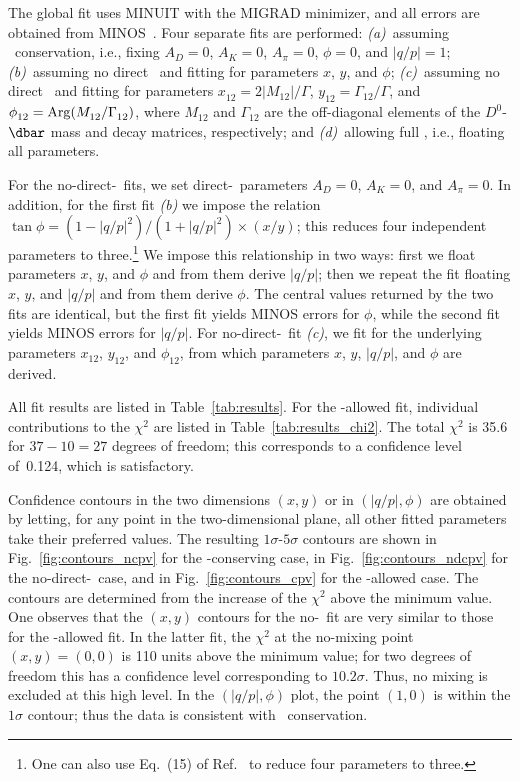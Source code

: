 The global fit uses MINUIT with the MIGRAD minimizer, 
and all errors are obtained from MINOS~\cite{MINUIT:webpage}. 
Four separate fits are performed: 
{\it (a)}\ assuming \cp\ conservation, i.e., fixing
$A^{}_D\!=\!0$, $A_K\!=\!0$, $A^{}_\pi\!=\!0$, $\phi\!=\!0$, 
and $|q/p|\!=\!1$;
{\it (b)}\ assuming no direct \cpv\ and fitting for
parameters $x$, $y$, and $\phi$; 
{\it (c)}\ assuming no direct \cpv\ and fitting for
parameters $x^{}_{12}= 2|M^{}_{12}|/\Gamma$, 
$y^{}_{12}= \Gamma^{}_{12}/\Gamma$, and 
$\phi^{}_{12}= {\rm Arg}(M^{}_{12}/\Gamma^{}_{12})$,
where $M^{}_{12}$ and $\Gamma^{}_{12}$ are the off-diagonal
elements of the $D^0$-$\dbar$ mass and decay matrices, respectively; and
{\it (d)}\ allowing full \cpv, i.e., floating all parameters. 

For the no-direct-\cpv\ fits, we set direct-\cpv\ parameters 
$A^{}_D\!=\!0$, $A_K\!=\!0$, and $A^{}_\pi\!=\!0$. In addition, for the 
first fit {\it (b)\/} we impose the relation~\cite{Ciuchini:2007cw,Kagan:2009gb}
$\tan\phi = (1-|q/p|^2)/(1+|q/p|^2)\times (x/y)$; this reduces 
four independent parameters to 
three.\footnote{One can also use Eq.~(15) of Ref.~\cite{Grossman:2009mn}
to reduce four parameters to three.} 
We impose this relationship in two ways:
first we float parameters $x$, $y$, and $\phi$ and from them derive $|q/p|$;
then we repeat the fit floating $x$, $y$, and $|q/p|$ and from them derive 
$\phi$. The central values returned by the two fits are identical, but the 
first fit yields MINOS errors for $\phi$, while the second fit 
yields MINOS errors for $|q/p|$. For no-direct-\cpv\ fit 
{\it (c)}, we fit for the underlying parameters $x^{}_{12}$, $y^{}_{12}$, 
and $\phi^{}_{12}$, from which parameters $x$, $y$, $|q/p|$, and $\phi$ 
are derived. 

All fit results are listed in 
Table~\ref{tab:results}. For the \cpv-allowed fit,
individual contributions to the $\chi^2$ are listed 
in Table~\ref{tab:results_chi2}. The total $\chi^2$ 
is 35.6 for $37-10=27$ degrees of freedom; this 
corresponds to a confidence level of~0.124, which 
is satisfactory.


Confidence contours in the two dimensions $(x,y)$ or 
in $(|q/p|,\phi)$ are obtained by letting, for any point in the
two-dimensional plane, all other fitted parameters take their 
preferred values. The resulting $1\sigma$-$5\sigma$ contours 
are shown 
in Fig.~\ref{fig:contours_ncpv} for the \cp-conserving case, 
in Fig.~\ref{fig:contours_ndcpv} for the no-direct-\cpv\ case, 
and in Fig.~\ref{fig:contours_cpv} for the \cpv-allowed 
case. The contours are determined from the increase of the
$\chi^2$ above the minimum value.
One observes that the $(x,y)$ contours for the no-\cpv\ fit 
are very similar to those for the \cpv-allowed fit. 
In the latter fit, the
$\chi^2$ at the no-mixing point $(x,y)\!=\!(0,0)$ is 110 units above 
the minimum value; for two degrees of freedom this has a confidence 
level corresponding to $10.2\sigma$. Thus, no mixing is excluded 
at this high level. In the $(|q/p|,\phi)$ plot, the point $(1,0)$ 
is within the $1\sigma$ contour; thus the data is consistent 
with \cp\ conservation.

